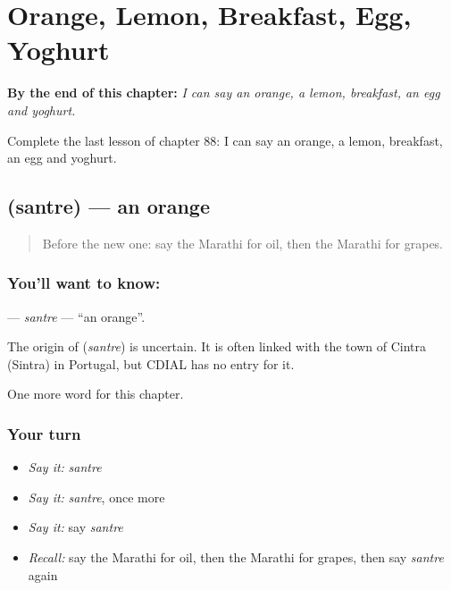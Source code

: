 
\chapter{Orange, Lemon, Breakfast, Egg, Yoghurt}
\label{ch:mr-orange-lemon-breakfast-egg-yoghurt}

\begin{chapteropening}
\textbf{By the end of this chapter:} \emph{I can say an orange, a lemon, breakfast, an egg and yoghurt.}

Complete the last lesson of chapter 88: I can say an orange, a lemon, breakfast, an egg and yoghurt.
\end{chapteropening}

\section[\texorpdfstring{\mr{संत्रे} (santre)}{संत्रे (santre)}]{ (santre) — an orange}

\label{lesson:MR-C88-santre}



\begin{quote}
Before the new one: say the Marathi for oil, then the Marathi for grapes.
\end{quote}

\subsection*{You'll want to know: }
\textbf{} — \emph{santre} — \textquotedblleft{}an orange\textquotedblright{}.

\begin{cousinweb}
The origin of \textbf{} (\emph{santre}) is uncertain. It is often linked with the town of Cintra (Sintra) in Portugal, but CDIAL has no entry for it.
\end{cousinweb}

\begin{grammarlens}[title={What you've built}]
One more word for this chapter.
\end{grammarlens}

\subsection*{Your turn}
\begin{itemize}
\raggedright
  \item \emph{Say it:} \emph{santre}
  \item \emph{Say it:} \emph{santre}, once more
  \item \emph{Say it:} say \emph{santre}
  \item \emph{Recall:} say the Marathi for oil, then the Marathi for grapes, then say \emph{santre} again
\end{itemize}


